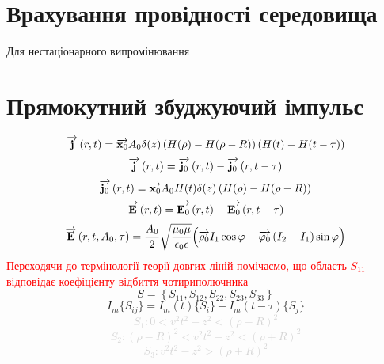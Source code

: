 \section{Врахування провідності середовища}

Для нестаціонарного випромінювання

\section{Прямокутний збуджуючий імпульс}
%
\begin{equation}
\overrightarrow{\mathbf j} \left( r, t \right) = \overrightarrow{\mathbf x_0} A_0 \delta(z) 
\left(  H(\rho) - H(\rho - R) \right) \left( H(t) - H(t-\tau) \right)
\end{equation}
%
\begin{equation}
\overrightarrow{\mathbf j} \left( r, t \right) = \overrightarrow{\mathbf j_0} \left( r, t \right) -
\overrightarrow{\mathbf j_0} \left( r, t - \tau \right)
\end{equation}
%
\textcolor{lightgray} { \begin{equation*}
\overrightarrow{\mathbf j_0} \left( r, t \right) = \overrightarrow{\mathbf x_0} A_0 H(t) \delta(z) 
\left(  H(\rho) - H(\rho - R) \right)
\end{equation*} }
%
\begin{equation}
\overrightarrow{\mathbf E} \left( r, t \right) = \overrightarrow{\mathbf E_0} \left( r, t \right) -
\overrightarrow{\mathbf E_0} \left( r, t - \tau \right)
\end{equation}
%
\begin{equation}
\overrightarrow{\mathbf E} \left( r, t, A_0, \tau \right) = \frac{A_0}{2} 
\sqrt{\frac{\mu_0 \mu}{\epsilon_0 \epsilon}}
\Big( \overrightarrow{\mathbf \rho_0} I_1 \cos \varphi - 
\overrightarrow{\mathbf \varphi_0} \left( I_2 - I_1 \right) \sin \varphi \Big)
\end{equation}
%
\textcolor{red} { Переходячи до термінології теорії довгих ліній помічаємо, 
що область $ S_{11} $ відповідає коефіцієнту відбиття чотириполючника }
%
\begin{equation}
S = \left\{ S_{11}, S_{12}, S_{22}, S_{23}, S_{33} \right\}
\end{equation}
%
\begin{equation}
I_m \{S_{ij}\} = I_m (t) \{S_i\} - I_m (t-\tau) \{S_j\}
\end{equation}
%
\textcolor{lightgray} { \begin{equation*}
S_1: 0 < v^2 t^2 - z^2 < \left( \rho - R \right)^2
\end{equation*}
%
\begin{equation*}
S_2: \left( \rho - R \right)^2 < v^2 t^2 - z^2 < \left( \rho + R \right)^2
\end{equation*}
%
\begin{equation*}
S_3: v^2 t^2 - z^2 > \left( \rho + R \right)^2
\end{equation*} }

